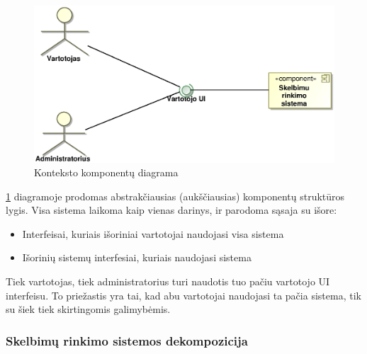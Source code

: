 \documentclass[12pt]{article}
\begin{document}
	\begin{figure}[h]
		\begin{center}
			\includegraphics[width=\textwidth]{Komponentai1.eps}
			\caption{Konteksto komponentų diagrama\label{Components1}}
		\end{center}
	\end{figure}
	
	\ref{Components1} diagramoje prodomas abstrakčiausias (aukščiausias) komponentų struktūros lygis. Visa sistema laikoma kaip vienas darinys, ir parodoma sąsaja su išore:
	
	\begin{itemize}	
		\item Interfeisai, kuriais išoriniai vartotojai naudojasi visa sistema
		\item Išorinių sistemų interfesiai, kuriais naudojasi sistema
	\end{itemize}
	
	Tiek vartotojas, tiek administratorius turi naudotis tuo pačiu vartotojo UI interfeisu. To priežastis yra tai, kad abu vartotojai naudojasi ta pačia sistema, tik su šiek tiek skirtingomis galimybėmis.	
	\pagebreak

	\subsubsection{Skelbimų rinkimo sistemos dekompozicija}
\end{document}
